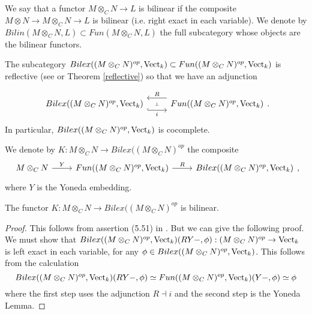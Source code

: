 \begin{definition}
We say that a functor $M\otimes_C N \to L$ is bilinear if the composite $M\otimes N\to M\otimes_C N \to L$ is bilinear (i.e. right exact in each variable). We denote by $Bilin(M\otimes_C N, L)\subset Fun(M\otimes_C N, L)$ the full subcategory whose objects are the bilinear functors. \end{definition}


The subcategory $Bilex((M\otimes_C N)^{op},\operatorname{Vect}_k)\subset Fun((M\otimes_C N)^{op},\operatorname{Vect}_k)$ is reflective (see \cite[Theorem 6.5]{kelly/basic-concepts-enriched} or Theorem \ref{reflective}) so that we have an adjunction

\[\begin{tikzcd}
	{Bilex((M\otimes_C N)^{op},\Vect_k)} & {Fun((M\otimes_C N)^{op},\Vect_k)}
	\arrow[""{name=0, anchor=center, inner sep=0}, "i"', shift right=3, hook, from=1-1, to=1-2]
	\arrow[""{name=1, anchor=center, inner sep=0}, "R"', shift right=3, from=1-2, to=1-1]
	\arrow["\dashv"{anchor=center, rotate=-90}, draw=none, from=1, to=0]
\end{tikzcd}.\] In particular, $Bilex((M\otimes_C N)^{op},\operatorname{Vect}_k)$ is cocomplete.

\begin{definition}\label{def_K}
We denote by $K:M\otimes_C N\to Bilex((M\otimes_C N)^{op}$ the composite \[\begin{tikzcd}
	{M\otimes_C N} & {Fun((M\otimes_C N)^{op},\Vect_k)} & {Bilex((M\otimes_C N)^{op},\Vect_k)}
	\arrow["Y", from=1-1, to=1-2]
	\arrow["R", from=1-2, to=1-3]
\end{tikzcd},\] where $Y$ is the Yoneda embedding.\end{definition}
\begin{lemma}\label{right_exact_0}

The functor $K:M\otimes_C N\to Bilex((M\otimes_C N)^{op}$ is bilinear.\end{lemma}

\begin{proof}

This follows from assertion (5.51) in \cite{kelly/basic-concepts-enriched}. But we can give the following proof. We must show that $Bilex((M\otimes_C N)^{op},\operatorname{Vect}_k)(RY-,\phi):(M\otimes_C N)^{op}\to\operatorname{Vect}_k$ is left exact in each variable, for any $\phi\in Bilex((M\otimes_C N)^{op},\operatorname{Vect}_k)$. This follows from the calculation $$Bilex((M\otimes_C N)^{op},\operatorname{Vect}_k)(RY-,\phi)\simeq Fun((M\otimes_C N)^{op},\operatorname{Vect}_k)(Y-,\phi)\simeq \phi$$ where the first step uses the adjunction $R\dashv i$ and the second step is the Yoneda Lemma.\end{proof}

